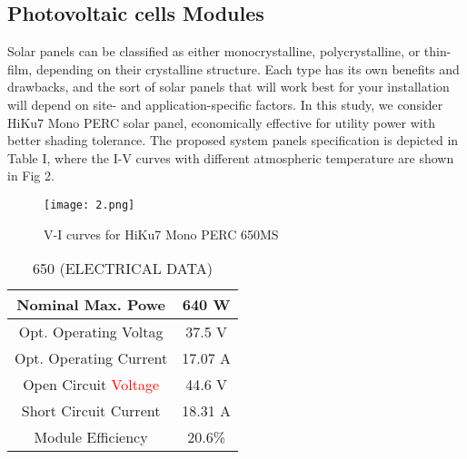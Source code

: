 \documentclass[conference]{IEEEtran}
\begin{document}
\subsection{Photovoltaic cells Modules}
Solar panels can be classified as either monocrystalline, polycrystalline, or thin-film, depending on their crystalline structure. Each type has its own benefits and drawbacks, and the sort of solar panels that will work best for your installation will depend on site- and application-specific factors. In this study, we consider HiKu7 Mono PERC solar panel, economically effective for utility power with better shading tolerance. The proposed system panels specification is depicted in Table I, where the I-V curves with different atmospheric temperature are shown in Fig 2.
\begin{figure}[htbp]
\centerline{\texttt{[image: 2.png]}}
\caption{V-I curves for HiKu7 Mono PERC 650MS }
\end{figure}
\begin{table}[]
\centering
\begin{tabular}{|c|c|}
\hline
Nominal Max. Powe      & 640 W   \\ \hline
Opt. Operating Voltag  & 37.5 V  \\ \hline
Opt. Operating Current & 17.07 A \\ \hline
Open Circuit \textcolor{red}{Voltage}    & 44.6 V  \\ \hline
Short Circuit Current  & 18.31 A \\ \hline
Module Efficiency      & 20.6\%  \\ \hline
\end{tabular}
\caption{650 (ELECTRICAL DATA) }
\label{tab:my-table}
\end{table}
\end{document}
